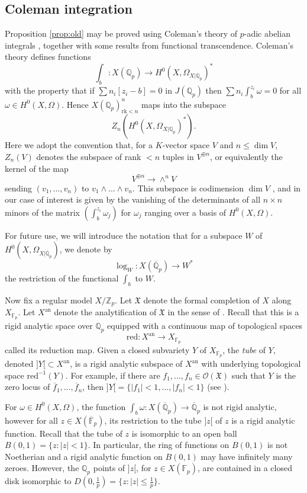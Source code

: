 \documentclass{amsart}
\def\Z{\mathbb Z}
\def\Q{\mathbb Q}
\newcommand{\rk}{\mathrm{rk}}
\newcommand{\an}{\mathrm{an}}
\theoremstyle{plain}
\theoremstyle{definition}
\newcommand{\red}{\mathrm{red}}
\newcommand{\F}{\mathbb{F}}
\begin{document}
\subsection{Coleman integration}
Proposition \ref{prop:old} may be proved using Coleman's theory of $p$-adic abelian integrals \cite{coleman:torsion} \cite{besser}, together with some results from functional transcendence. Coleman's theory defines functions
\[
\int _b :X(\Q _p )\to H^0 (X,\Omega _{X|\Q _p })^*
\]
with the property that if $\sum n_i [z_i -b]=0$ in $J(\Q _p )$ then $\sum n_i \int ^{z_i }_b \omega =0$ for all $\omega \in H^0 (X,\Omega )$. Hence $X(\Q _p )^n _{\rk <n}$ maps into the subspace 
\[
Z_n (H^0 (X,\Omega _{X|\Q _p })^* ).
\]
Here we adopt the convention that, for a $K$-vector space $V$ and $n\leq \dim V$, $Z_n (V)$ denotes the subspace of rank $<n$ tuples in $V^{\oplus n}$, or equivalently the kernel of the map
\[
V^{\oplus n}\to \wedge ^n V
\]
sending $(v_1 ,\ldots ,v_n )$ to $v_1 \wedge \ldots \wedge v_n $. This subspace is codimension $\dim V$ \cite{eisenbud}, and in our case of interest is given by the vanishing of the determinants of all $n\times n$ minors of the matrix $(\int ^{z_i }_b \omega _j )$ for $\omega _j $ ranging over a basis of $H^0 (X,\Omega )$.

For future use, we will introduce the notation that for a subspace $W$ of $H^0 (X,\Omega _{X|\overline{\Q }_p })$, we denote by 
\[
\log _W :X(\overline{\Q }_p )\to W^*
\] the restriction of the functional $\int _b $ to $W$.

Now fix a regular model $X/\Z _p $. Let $\mathfrak{X}$ denote the formal completion of $X$ along $X _{\F _p }$. Let $X^{\an }$ denote the analytification of $\mathfrak{X}$ in the sense of \cite{FvP}. Recall that this is a rigid analytic space over $\Q _p $ equipped with a continuous map of topological spaces
\[
\red :X^{\an }\to X_{\F _p }
\]
called its reduction map. Given a closed subvariety $Y$ of $X_{\F _p }$, the \textit{tube} of $Y$, denoted $]Y[\subset X^{\an }$, is a rigid analytic subspace of $X^{\an }$ with underlying topological space $\red ^{-1}(Y)$. For example, if there are $f_1 ,\ldots ,f_n \in \mathcal{O}(\mathfrak{X})$ such that $Y$ is the zero locus of $\overline{f}_1 ,\ldots ,\overline{f}_n$, then $]Y[=\{ |f_1 |<1,\ldots ,|f_n |<1 \}$ (see \cite[2.2.10]{LS}).

For $\omega \in H^0 (X,\Omega )$, the function $\int _b \omega :X(\overline{\Q} _p )\to \overline{\Q }_p $ is not rigid analytic, however for all $z\in X(\overline{\F }_p )$, its restriction to the tube $]z[$ of $z$ is a rigid analytic function. 
Recall that the tube of $z$ is isomorphic to an open ball $B(0,1)=\{ z:|z|<1 \}$. In particular, the ring of functions on $B(0,1)$ is not Noetherian and a rigid analytic function on $B(0,1)$ may have infinitely many zeroes. However, the $\Q _p $ points of $]z[$, for $z\in X(\F _p )$, are contained in a closed disk isomorphic to $D(0,\frac{1}{p})=\{ z:|z|\leq \frac{1}{p} \}$. 
\end{document}
